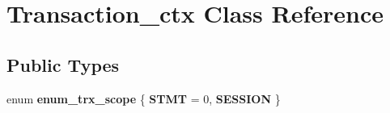 \hypertarget{classTransaction__ctx}{}\section{Transaction\+\_\+ctx Class Reference}
\label{classTransaction__ctx}
\subsection*{Public Types}
\begin{DoxyCompactItemize}
\item 
\mbox{\label{classTransaction__ctx_afefc7b9787a131a5c91e53bfcedb1a79}} 
enum {\bfseries enum\+\_\+trx\+\_\+scope} \{ {\bfseries S\+T\+MT} = 0, 
{\bfseries S\+E\+S\+S\+I\+ON}
 \}
\end{DoxyCompactItemize}

